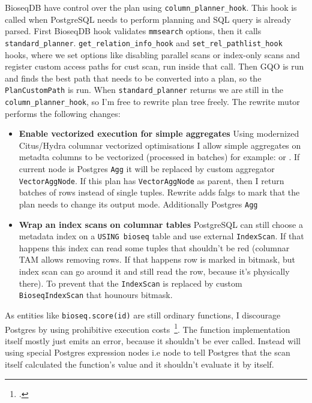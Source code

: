BioseqDB have control over the plan using \texttt{column\_planner\_hook}.
This hook is called when PostgreSQL needs to perform planning and SQL query is already parsed. 
First BioseqDB hook validates \texttt{mmsearch} options, then it calls \texttt{standard\_planner}.
\texttt{get\_relation\_info\_hook} and \texttt{set\_rel\_pathlist\_hook} hooks, where we set options like disabling parallel scans or index-only scans and register custom access paths for cust scan, run inside that call.
Then GQO is run and finds the best path that needs to be converted into a plan, so the \texttt{PlanCustomPath} is run.
When \texttt{standard\_planner} returns we are still in the  \texttt{column\_planner\_hook}, so I'm free to rewrite plan tree freely.
The rewrite mutor performs the following changes:
\begin{itemize}
  \item \textbf{Enable vectorized execution for simple aggregates}
    Using modernized Citus/Hydra columnar vectorized optimisations I allow simple aggregates on metadta columns to be vectorized (processed in batches) for example:  or .
    If current node is Postgres \texttt{Agg} it will be replaced by custom aggregator \texttt{VectorAggNode}.
    If this plan has \texttt{VectorAggNode} as parent, then I return batches of rows instead of single tuples. Rewrite adds falgs to mark that the plan needs to change its output mode.
    Additionally Postgres \texttt{Agg}
  \item \textbf{Wrap an index scans on columnar tables}
    PostgreSQL can still choose a metadata index on a \texttt{USING bioseq} table and use external \texttt{IndexScan}.
    If that happens this index can read some tuples that shouldn't be red (columnar TAM allows removing rows. If that happens row is marked in bitmask, but index scan can go around it and still read the row, because it's physically there).
    To prevent that the \texttt{IndexScan} is replaced by custom \texttt{BioseqIndexScan} that hounours bitmask.
\end{itemize}

As entities like \texttt{bioseq.score(id)} are still ordinary functions, I discourage Postgres by using prohibitive execution costs~\footcite{postgresql17_support_functions}.
The function implementation itself mostly just emits an error, because it shouldn't be ever called.
Instead  will using special Postgres expression nodes i.e  node to tell Postgres that the scan itself calculated the function's value and it shouldn't evaluate it by itself.

